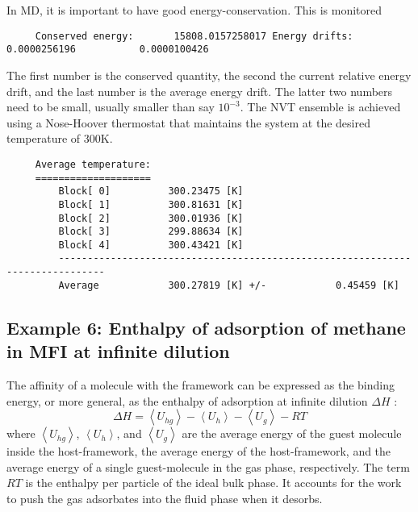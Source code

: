 In MD, it is important to have good energy-conservation. This is monitored
\begin{tiny}
\begin{verbatim}
     Conserved energy:       15808.0157258017 Energy drifts:  0.0000256196           0.0000100426
\end{verbatim}
\end{tiny}
The first number is the conserved quantity, the second the current relative energy drift, and the last number is the average energy drift.
The latter two numbers need to be small, usually smaller than say $10^{-3}$.
The NVT ensemble is achieved using a Nose-Hoover thermostat that maintains the system at the desired temperature of 300K.
\begin{tiny}
\begin{verbatim}
     Average temperature:
     ====================
         Block[ 0]          300.23475 [K]
         Block[ 1]          300.81631 [K]
         Block[ 2]          300.01936 [K]
         Block[ 3]          299.88634 [K]
         Block[ 4]          300.43421 [K]
         ------------------------------------------------------------------------------
         Average            300.27819 [K] +/-            0.45459 [K]
\end{verbatim}
\end{tiny}

\subsection*{Example 6: Enthalpy of adsorption of methane in MFI at infinite dilution}

The affinity of a molecule with the framework can be expressed as the binding energy, or more general, as the enthalpy of adsorption
at infinite dilution $\Delta H$ \cite{Wood1988}:
\begin{equation}
 \Delta H = \left\langle U_{hg}\right\rangle - \left\langle U_{h}\right\rangle - \left\langle U_{g}\right\rangle - RT
\end{equation}
where $\left\langle U_{hg}\right\rangle$, $\left\langle U_{h}\right\rangle$, and $\left\langle U_{g}\right\rangle$
are the average energy of the guest molecule inside the host-framework, the average energy of the host-framework, and
the average energy of a single guest-molecule in the gas phase, respectively.
The term $RT$ is the enthalpy per particle of the ideal bulk phase.
It accounts for the work to push the gas adsorbates into the fluid phase when it desorbs.

